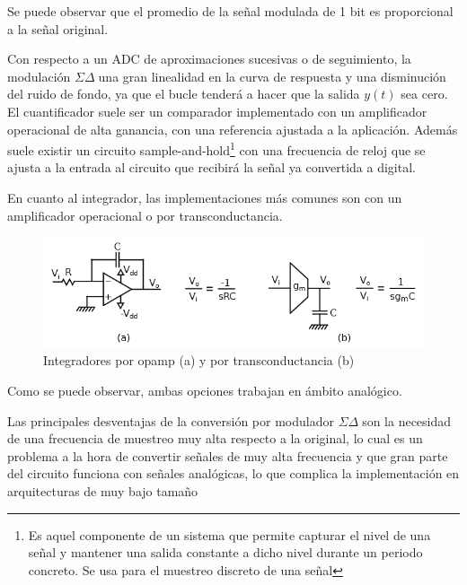 \documentclass[12pt]{report} %
\newcommand{\sigmadelta}{$\Sigma\Delta\; $}
\begin{document}
	
	Se puede observar que el promedio de la señal modulada de 1 bit es proporcional a la señal original.
	
	Con respecto a un ADC de aproximaciones sucesivas o de seguimiento, la modulación \sigmadelta una gran linealidad en la curva de respuesta y una disminución del ruido de fondo, ya que el bucle tenderá a hacer que la salida $y(t)$ sea cero. El cuantificador suele ser un comparador implementado con un amplificador operacional de alta ganancia, con una referencia ajustada a la aplicación. Además suele existir un circuito sample-and-hold\footnote{Es aquel componente de un sistema que permite capturar el nivel de una señal y mantener una salida constante a dicho nivel durante un periodo concreto. Se usa para el muestreo discreto de una señal} con una frecuencia de reloj que se ajusta a la entrada al circuito que recibirá la señal ya convertida a digital.
	
	En cuanto al integrador, las implementaciones más comunes son con un amplificador operacional o por transconductancia.
	
	\begin{figure}[H]
		\includegraphics[width=\textwidth]{integrator-opamp-trans.png}
		\caption[Integradores por opamp (a) y por transconductancia (b)]{Integradores por opamp (a) y por transconductancia (b)\protect\footnotemark}
		\label{fig:integrator-opamp-trans.png}
	\end{figure}
	
	
	Como se puede observar, ambas opciones trabajan en ámbito analógico.
	
	Las principales desventajas de la conversión por modulador \sigmadelta son la necesidad de una frecuencia de muestreo muy alta respecto a la original, lo cual es un problema a la hora de convertir señales de muy alta frecuencia y que gran parte del circuito funciona con señales analógicas, lo que complica la implementación en arquitecturas de muy bajo tamaño
	
\end{document}
